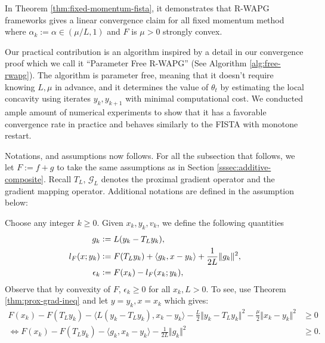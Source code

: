 \documentclass[12pt]{article}
\begin{document}
        In Theorem \ref{thm:fixed-momentum-fista}, it demonstrates that R-WAPG frameworks gives a linear convergence claim for all fixed momentum method where $\alpha_k := \alpha \in (\mu/L, 1)$ and  $F$ is $\mu > 0$ strongly convex. 
        \par
        Our practical contribution is an algorithm inspired by a detail in our convergence proof which we call it ``Parameter Free R-WAPG'' (See Algorithm \ref{alg:free-rwapg}). 
        The algorithm is parameter free, meaning that it doesn't require knowing $L, \mu$ in advance, and it determines the value of $\theta_t$ by estimating the local concavity using iterates $y_{k}, y_{k + 1}$ with minimal computational cost. 
        We conducted ample amount of numerical experiments to show that it has a favorable convergence rate in practice and behaves similarly to the FISTA with monotone restart. 
        \par
        Notations, and assumptions now follows. 
        For all the subsection that follows, we let $F:= f + g$ to take the same assumptions as in Section \ref{sssec:additive-composite}. 
        Recall $T_L$, $\mathcal G_L$ denotes the proximal gradient operator and the gradient mapping operator. 
        Additional notations are defined in the assumption below: 
        \begin{assumption}
            Choose any integer $k\ge 0$. 
            Given $x_k, y_k, v_k$, we define the following quantities
            \begin{align}
                g_k &\vcentcolon= L(y_k - T_L y_k), 
                \label{eqn:grad-map}
                \\
                l_F(x; y_k) &\vcentcolon= F(T_Ly_k) + \langle g_k, x - y_k\rangle + \frac{1}{2L}\Vert g_k\Vert^2, 
                \label{eqn:lower-linearization}
                \\
                \epsilon_{k} &\vcentcolon= F(x_k) - l_F(x_k; y_k), 
                \label{eqn:regret}
            \end{align}
            Observe that by convexity of $F$, $\epsilon_k \ge 0$ for all $x_k, L > 0$. 
            To see, use Theorem \ref{thm:prox-grad-ineq} and let $y = y_k, x = x_k$ which gives: 
            \begin{align*}
                F(x_k) - F(T_Ly_k)
                - \langle L(y_k - T_Ly_k),x_k - y_k \rangle
                - \frac{L}{2}\Vert y_k - T_Ly_k\Vert^2
                - \frac{\mu}{2}\Vert x_k - y_k\Vert^2
                &\ge 0
                \\
                \iff 
                F(x_k) - F(T_Ly_k)
                - \langle g_k,x_k - y_k \rangle
                - \frac{1}{2L}\Vert g_k\Vert^2
                &\ge 0. 
            \end{align*}
        \end{assumption}
        \par
\end{document}
